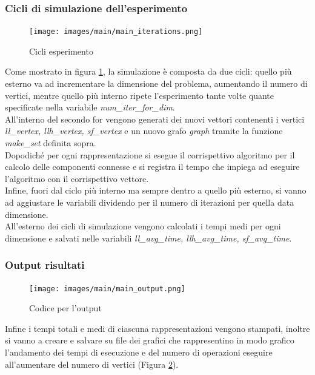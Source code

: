 \documentclass[12pt]{article}
\begin{document}
\subsubsection{Cicli di simulazione dell'esperimento}
\begin{figure}[h]
    \centering
    \texttt{[image: images/main/main\_iterations.png]}
    \caption{Cicli esperimento}
    \label{fig:main_cycle}
\end{figure}
Come mostrato in figura \ref{fig:main_cycle}, la simulazione è composta da due cicli: quello più esterno va ad incrementare la dimensione del problema, aumentando il numero di vertici, mentre quello più interno ripete l'esperimento tante volte quante specificate nella variabile \textit{num\_iter\_for\_dim}.\\
All'interno del secondo for vengono generati dei nuovi vettori contenenti i vertici \textit{ll\_vertex, llh\_vertex, sf\_vertex} e un nuovo grafo \textit{graph} tramite la funzione \textit{make\_set} definita sopra.\\
Dopodiché per ogni rappresentazione si esegue il corrispettivo algoritmo per il calcolo delle componenti connesse e si registra il tempo che impiega ad eseguire l'algoritmo con il corrispettivo vettore.\\
Infine, fuori dal ciclo più interno ma sempre dentro a quello più esterno, si vanno ad aggiustare le variabili dividendo per il numero di iterazioni per quella data dimensione.\\
All'esterno dei cicli di simulazione vengono calcolati i tempi medi per ogni dimensione e salvati nelle variabili \textit{ll\_avg\_time, llh\_avg\_time, sf\_avg\_time}.

\subsubsection{Output risultati}
\begin{figure}[h]
    \centering
    \texttt{[image: images/main/main\_output.png]}
    \caption{Codice per l'output}
    \label{fig:main_output}
\end{figure}
Infine i tempi totali e medi di ciascuna rappresentazioni vengono stampati, inoltre si vanno a creare e salvare su file dei grafici che rappresentino in modo grafico l'andamento dei tempi di esecuzione e del numero di operazioni eseguire all'aumentare del numero di vertici (Figura \ref{fig:main_output}).

\end{document}
